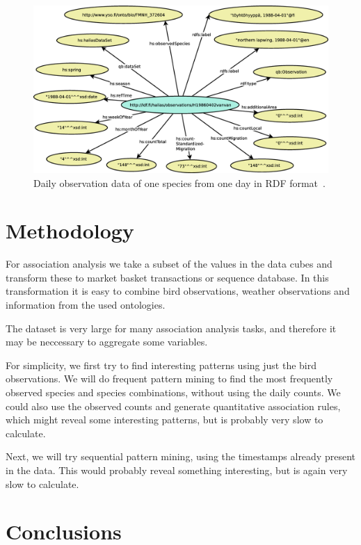 \documentclass[english]{tktltiki2}
\begin{document}
\begin{figure}[htb]
\centering
\includegraphics[clip=true, width=\textwidth]{havaintograafi}
\caption{Daily observation data of one species from one day in RDF format~\cite{koho2015gradu}.}
\label{fig: havaintograafi}
\end{figure}



\section{Methodology}

For association analysis we take a subset of the values in the data cubes and transform these to market basket transactions or sequence database. In this transformation it is easy to combine bird observations, weather observations and information from the used ontologies.

The dataset is very large for many association analysis tasks, and therefore it may be neccessary to aggregate some variables.

For simplicity, we first try to find interesting patterns using just the bird observations. We will do frequent pattern mining to find the most frequently observed species and species combinations, without using the daily counts. We could also use the observed counts and generate quantitative association rules, which might reveal some interesting patterns, but is probably very slow to calculate.

Next, we will try sequential pattern mining, using the timestamps already present in the data. This would probably reveal something interesting, but is again very slow to calculate.


\section{Conclusions}
\end{document}
